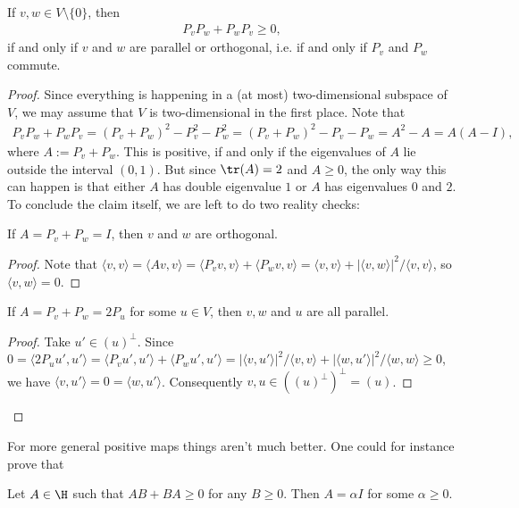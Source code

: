 \begin{prop}\label{symmetric_projection}
	If $v, w \in V \setminus \{0\}$, then
	\begin{align*}
		P_{v} P_{w} + P_{w} P_{v} \geq 0,
	\end{align*}
	if and only if $v$ and $w$ are parallel or orthogonal, i.e. if and only if $P_{v}$ and $P_{w}$ commute.
\end{prop}
\begin{proof}
	Since everything is happening in a (at most) two-dimensional subspace of $V$, we may assume that $V$ is two-dimensional in the first place. Note that
	\begin{align*}
		P_{v} P_{w} + P_{w} P_{v} = (P_{v} + P_{w})^2 - P_{v}^2 - P_{w}^2 = (P_{v} + P_{w})^2 - P_{v} - P_{w} = A^2 - A = A (A - I),
	\end{align*}
	where $A := P_{v} + P_{w}$. This is positive, if and only if the eigenvalues of $A$ lie outside the interval $(0, 1)$. But since $\tr(A) = 2$ and $A \geq 0$, the only way this can happen is that either $A$ has double eigenvalue $1$ or $A$ has eigenvalues $0$ and $2$. To conclude the claim itself, we are left to do two reality checks:
	\begin{lem}
		If $A = P_{v} + P_{w} = I$, then $v$ and $w$ are orthogonal.
	\end{lem}
	\begin{proof}
		Note that $\langle v, v \rangle = \langle A v, v \rangle = \langle P_{v} v, v \rangle + \langle P_{w} v, v \rangle = \langle v, v \rangle + |\langle v, w \rangle|^2/\langle v, v\rangle$, so $\langle v, w \rangle = 0$.
	\end{proof}
	\begin{lem}
		If $A = P_{v} + P_{w} = 2 P_{u}$ for some $u \in V$, then $v, w$ and $u$ are all parallel.
	\end{lem}
	\begin{proof}
		Take $u' \in (u)^{\perp}$. Since $0 = \langle 2 P_{u} u', u' \rangle =  \langle P_{v} u', u' \rangle +  \langle P_{w} u', u' \rangle = |\langle v, u' \rangle|^2/\langle v, v\rangle + |\langle w, u' \rangle|^2/\langle w, w\rangle \geq 0$, we have $\langle v, u' \rangle = 0 = \langle w, u' \rangle$. Consequently $v, u \in ((u)^{\perp})^{\perp} = (u)$.
	\end{proof}
\end{proof}

For more general positive maps things aren't much better. One could for instance prove that

\begin{prop}
	Let $A \in \H$ such that $A B + B A \geq 0$ for any $B \geq 0$. Then $A = \alpha I$ for some $\alpha \geq 0$.
\end{prop}

